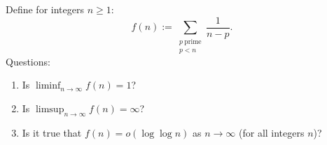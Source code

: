 Define for integers $n\ge 1$:
\[
f(n):=\sum_{\substack{p\ \text{prime}\\ p<n}}\frac{1}{n-p}.
\]
Questions:
\begin{enumerate}
\item Is $\liminf_{n\to\infty} f(n)=1$?
\item Is $\limsup_{n\to\infty} f(n)=\infty$?
\item Is it true that $f(n)=o(\log\log n)$ as $n\to\infty$ (for all integers $n$)?
\end{enumerate}
